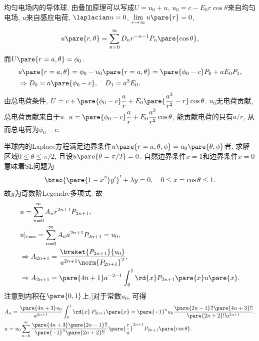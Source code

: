 \documentclass[hidelinks]{ctexart}
\begin{document}
\begin{sample}
    \begin{ex}
        均匀电场内的导体球, 由叠加原理可以写成$U = u_0 + u$, $u_0 = c-E_0 r\cos\theta$来自均匀电场, $u$来自感应电荷, $\laplacian u = 0$, $\displaystyle \lim_{r\rightarrow \infty} u\pare{r} = 0$,
        \[ u\pare{r,\theta} = \sum_{n=0}^\infty D_n r^{-n-1}P_n\pare{\cos\theta}, \]
        而$U\pare{r=a,\theta} = \phi_0$.
        \begin{align*}
            & u\pare{r=a,\theta} = \phi_0 - u_0\pare{r=a,\theta} = \pare{\phi_0 - c}P_0 + aE_0 P_1, \\
            & \Rightarrow D_0 = a\pare{\phi_0 - c},\quad D_1 = a^3 E_0.
        \end{align*}
        由总电荷条件, $\displaystyle U = c+\pare{\phi_0 - c}\frac{a}{r} + E_0\pare{\frac{a^3}{r^2}-r}\cos\theta$. $u_0$无电荷贡献, 总电荷贡献来自于$u$. $\displaystyle u = \pare{\phi_0 - c}\frac{a}{r} + E_0 \frac{a^3}{r^2}\cos\theta$, 能贡献电荷的只有$a/r$, 从而总电荷为$\phi_0  - c$.
    \end{ex}
\end{sample}
\begin{sample}
    \begin{ex}
        半球内的Laplace方程满足边界条件$u\pare{r=a,\theta,\phi} = u_0\pare{\theta,\phi}$者, 求解区域$0\le \theta \le \pi/2$, 且设$u\pare{\theta = \pi/2} = 0$. 自然边界条件$x=1$和边界条件$x=0$意味着SL问题为
        \[ \brac{\pare{1-x^2}y'}' + \lambda y = 0,\quad 0\le x=\cos\theta \le 1. \]
        故$y$为奇数阶Legendre多项式. 故
        \begin{align*}
            & u = \sum_{n=0}^\infty A_n r^{2n+1}P_{2n+1},\\
            & u\vert_{r=a} = \sum_{n=0}^\infty A_n a^{2n+1}P_{2n+1} = u_0, \\
            & \Rightarrow A_{2n+1} = \frac{\braket{P_{2n+1}}{u_0}}{a^{2n+1}\norm{P_{2n+1}}^2}, \\
            & \Rightarrow A_{2n+1} = \pare{4n+1}a^{-2-1}\int_0^1 \rd{x} P_{2n+1}\pare{x}u\pare{x}.
        \end{align*}
        注意到内积在$\pare{0,1}$上.]对于常数$u_0$, 可得
        \begin{align*}
            & A_n = \frac{\pare{4n+3}u_0}{a^{2n+1}} \int_0^1 \rd{x}\, P_{2n+1}\pare{x} = \pare{-1}^n u_0 \frac{\pare{2n-1}!!\pare{4n+3}!!}{\pare{2n+2}!!a^{2n+1}}.\\
            & u = u_0 \sum_{n=0}^\infty \frac{\pare{4n+3}\pare{2n-1}!!}{\pare{-1}^n \pare{2n+2}!!}\pare{\frac{r}{a}}^{2n+1}P_{2n+1}\pare{\cos\theta}.
        \end{align*}
    \end{ex}
\end{sample}
\end{document}
